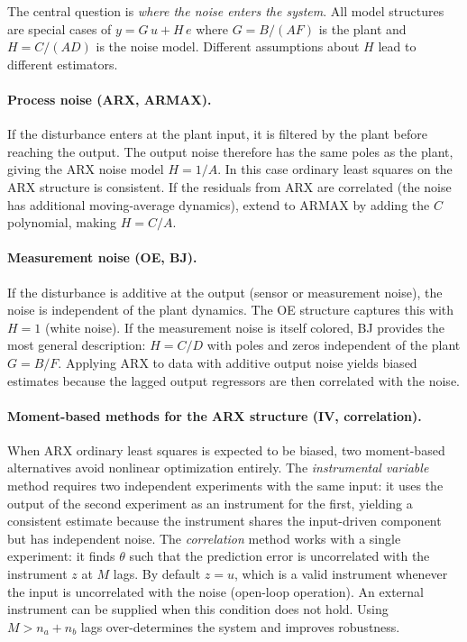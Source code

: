 \documentclass[11pt,a4paper]{article}
\begin{document}
The central question is \emph{where the noise enters the system}.
All model structures are special cases of
$y = G\,u + H\,e$ where $G = B/(AF)$ is the plant and
$H = C/(AD)$ is the noise model.  Different assumptions about $H$
lead to different estimators.

\paragraph{Process noise (ARX, ARMAX).}
If the disturbance enters at the plant input, it is filtered by the
plant before reaching the output.  The output noise therefore has
the same poles as the plant, giving the ARX noise model
$H = 1/A$.  In this case ordinary least squares on the ARX
structure is consistent.  If the residuals from ARX are correlated
(the noise has additional moving-average dynamics), extend to ARMAX
by adding the $C$ polynomial, making $H = C/A$.

\paragraph{Measurement noise (OE, BJ).}
If the disturbance is additive at the output (sensor or measurement
noise), the noise is independent of the plant dynamics.  The OE
structure captures this with $H = 1$ (white noise).  If the
measurement noise is itself colored, BJ provides the most general
description: $H = C/D$ with poles and zeros independent of the
plant $G = B/F$.  Applying ARX to data with additive output noise
yields biased estimates because the lagged output regressors are
then correlated with the noise.

\paragraph{Moment-based methods for the ARX structure (IV, correlation).}
When ARX ordinary least squares is expected to be biased, two
moment-based alternatives avoid nonlinear optimization entirely.
The \emph{instrumental variable} method requires two independent
experiments with the same input: it uses the output of the second
experiment as an instrument for the first, yielding a consistent
estimate because the instrument shares the input-driven component
but has independent noise.
The \emph{correlation} method works with a single experiment: it
finds $\theta$ such that the prediction error is uncorrelated with
the instrument $z$ at $M$ lags.  By default $z = u$, which is a
valid instrument whenever the input is uncorrelated with the noise
(open-loop operation).  An external instrument can be supplied when
this condition does not hold.  Using $M > n_a + n_b$ lags
over-determines the system and improves robustness.
\end{document}
